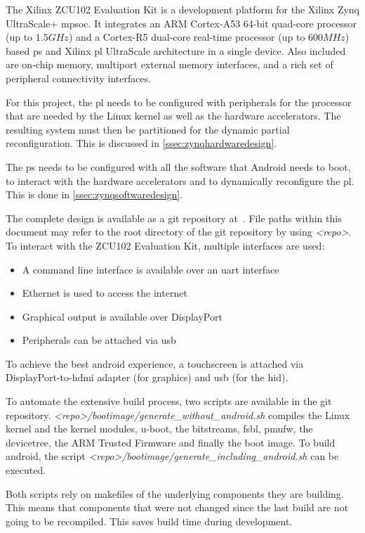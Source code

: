 The Xilinx ZCU102 Evaluation Kit is a development platform for the Xilinx Zynq UltraScale+ \gls{mpsoc}.
It integrates an ARM Cortex-A53 64-bit quad-core processor (up to $1.5 GHz$) and a Cortex-R5 dual-core real-time processor (up to $600 MHz$) based \gls{ps} and Xilinx \gls{pl} UltraScale architecture in a single device. Also included are on-chip memory, multiport external memory interfaces, and a rich set of peripheral connectivity interfaces.

For this project, the \gls{pl} needs to be configured with peripherals for the
processor that are needed by the Linux kernel as well as the hardware
accelerators.
The resulting system must then be partitioned for the dynamic partial
reconfiguration.
This is discussed in \cref{ssec:zynqhardwaredesign}.

The \gls{ps} needs to be configured with all the software that Android needs to
boot, to interact with the hardware accelerators and to dynamically reconfigure
the \gls{pl}.
This is done in \cref{ssec:zynqsoftwaredesign}.

The complete design is available as a git repository at~\cite{repo}.
File paths within this document may refer to the root directory of the git
repository by using \emph{<repo>}.
To interact with the ZCU102 Evaluation Kit, multiple interfaces are used:
\begin{itemize}
	\item A command line interface is available over an \gls{uart} interface
	\item Ethernet is used to access the internet
	\item Graphical output is available over DisplayPort
	\item Peripherals can be attached via \gls{usb}
\end{itemize}

To achieve the best android experience, a touchscreen is attached via DisplayPort-to-\gls{hdmi} adapter (for graphics) and \gls{usb} (for the \gls{hid}).

To automate the extensive build process, two scripts are available in the git
repository.
\emph{<repo>/bootimage/generate\_without\_android.sh} compiles the Linux kernel and the kernel modules, u-boot, the bitstreams, \gls{fsbl}, \gls{pmufw}, the devicetree, the ARM Trusted Firmware and finally the boot image. To build android, the script \emph{<repo>/bootimage/generate\_including\_android.sh} can be executed.

Both scripts rely on makefiles of the underlying components they are building. This means that components that were not changed since the last build are not going to be recompiled. This saves build time during development.

